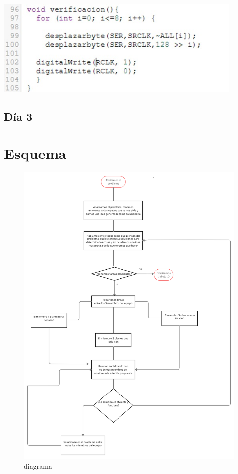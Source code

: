 \documentclass{article}
\begin{document}
\vspace{0.5cm}

\includegraphics[width=12cm]{Veri.jpeg}

\subsection{Día 3}
\label{fig:my_label}
\section{Esquema} \label{contenido}
\begin{figure}
    \centering
    \includegraphics[width=16cm]{diagrama.png}
    \caption{diagrama}
    \label{fig:my_label}
\end{figure}


\end{document}
